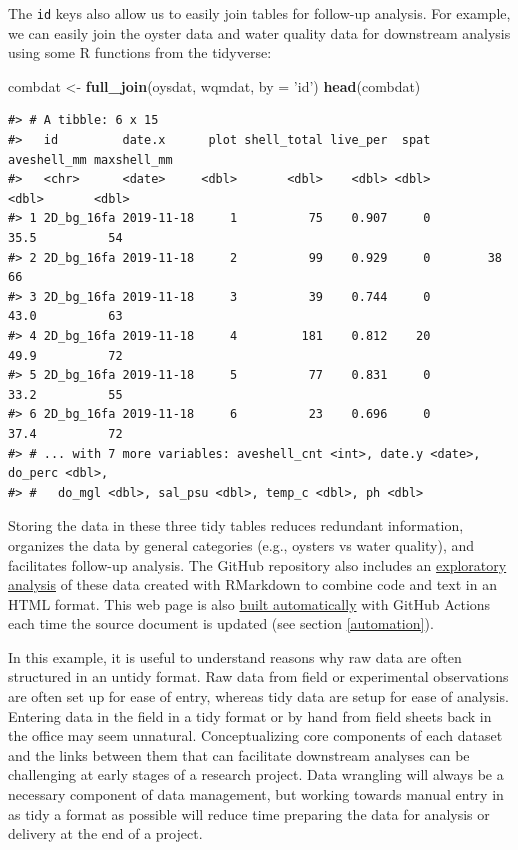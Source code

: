 \documentclass[
]{book}
\newenvironment{Shaded}{\begin{snugshade}}{\end{snugshade}}
\newcommand{\DataTypeTok}[1]{\textcolor[rgb]{0.13,0.29,0.53}{#1}}
\newcommand{\KeywordTok}[1]{\textcolor[rgb]{0.13,0.29,0.53}{\textbf{#1}}}
\newcommand{\NormalTok}[1]{#1}
\newcommand{\StringTok}[1]{\textcolor[rgb]{0.31,0.60,0.02}{#1}}
\begin{document}
The \texttt{id} keys also allow us to easily join tables for follow-up analysis. For example, we can easily join the oyster data and water quality data for downstream analysis using some R functions from the tidyverse:

\begin{Shaded}
\begin{Highlighting}[]
\NormalTok{combdat <-}\StringTok{ }\KeywordTok{full_join}\NormalTok{(oysdat, wqmdat, }\DataTypeTok{by =} \StringTok{'id'}\NormalTok{)}
\KeywordTok{head}\NormalTok{(combdat)}
\end{Highlighting}
\end{Shaded}

\begin{verbatim}
#> # A tibble: 6 x 15
#>   id         date.x      plot shell_total live_per  spat aveshell_mm maxshell_mm
#>   <chr>      <date>     <dbl>       <dbl>    <dbl> <dbl>       <dbl>       <dbl>
#> 1 2D_bg_16fa 2019-11-18     1          75    0.907     0        35.5          54
#> 2 2D_bg_16fa 2019-11-18     2          99    0.929     0        38            66
#> 3 2D_bg_16fa 2019-11-18     3          39    0.744     0        43.0          63
#> 4 2D_bg_16fa 2019-11-18     4         181    0.812    20        49.9          72
#> 5 2D_bg_16fa 2019-11-18     5          77    0.831     0        33.2          55
#> 6 2D_bg_16fa 2019-11-18     6          23    0.696     0        37.4          72
#> # ... with 7 more variables: aveshell_cnt <int>, date.y <date>, do_perc <dbl>,
#> #   do_mgl <dbl>, sal_psu <dbl>, temp_c <dbl>, ph <dbl>
\end{verbatim}

Storing the data in these three tidy tables reduces redundant information, organizes the data by general categories (e.g., oysters vs water quality), and facilitates follow-up analysis. The GitHub repository also includes an \href{https://tbep-tech.github.io/tberf-oyster/figures.html}{exploratory analysis} of these data created with RMarkdown \citep{Xie18} to combine code and text in an HTML format. This web page is also \href{https://github.com/tbep-tech/tberf-oyster/actions}{built automatically} with GitHub Actions each time the source document is updated (see section \ref{automation}).

In this example, it is useful to understand reasons why raw data are often structured in an untidy format. Raw data from field or experimental observations are often set up for ease of entry, whereas tidy data are setup for ease of analysis. Entering data in the field in a tidy format or by hand from field sheets back in the office may seem unnatural. Conceptualizing core components of each dataset and the links between them that can facilitate downstream analyses can be challenging at early stages of a research project. Data wrangling will always be a necessary component of data management, but working towards manual entry in as tidy a format as possible will reduce time preparing the data for analysis or delivery at the end of a project.
\end{document}
